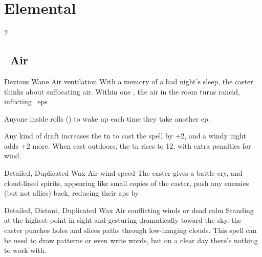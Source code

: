 \section{Elemental }

\begin{multicols}{2}

\subsection[Air]{~Air}
\label{airSpells}

\setcounter{diceNo}{1}%



  {Devious}%
  {Wane}%
  {Air}%
  {ventilation}%
  {With a memory of a bad night's sleep, the caster thinks about suffocating air.
  Within one \showOnset, the air in the room turns rancid, inflicting ~\glspl{ep}}%
  {Anyone inside rolls  (\tn[10]) to wake up each time they take another \gls{ep}.

  Any kind of draft increases the \gls{tn} to cast the spell by +2, and a windy night adds +2 more.
  When cast outdoors, the \gls{tn} rises to 12, with extra penalties for wind.}

\label{ManaVoidSpell}


  {Detailed, Duplicated}%
  {Wax}%
  {Air}%
  {wind speed}%
  {The caster gives a battle-cry, and cloud-lined spirits, appearing like small copies of the caster, push any enemies (but not allies) back, reducing their \glspl{ap} by }%
  {}



  {Detailed, Distant, Duplicated}%
  {Wax}%
  {Air}%
  {conflicting winds or dead calm}%
  {Standing at the highest point in sight and gesturing dramatically toward the sky, the caster punches holes and slices paths through low-hanging clouds. This \gls{spell} can be used to draw patterns or even write words, but on a clear day there's nothing to work with.}%


\end{multicols}
